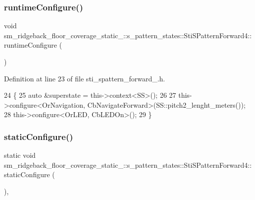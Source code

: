 \subsubsection{\texorpdfstring{runtime\+Configure()}{runtimeConfigure()}}
{\footnotesize\ttfamily void sm\+\_\+ridgeback\+\_\+floor\+\_\+coverage\+\_\+static\+\_\+::s\+\_\+pattern\+\_\+states\+::\+Sti\+S\+Pattern\+Forward4\+::runtime\+Configure (\begin{DoxyParamCaption}{ }\end{DoxyParamCaption})\hspace{0.3cm}{\ttfamily [inline]}}



Definition at line 23 of file sti\+\_\+spattern\+\_\+forward\+\_.\+h.


\begin{DoxyCode}
24   \{
25     \textcolor{keyword}{auto} &superstate = this->context<SS>();
26 
27     this->configure<OrNavigation, CbNavigateForward>(SS::pitch2\_lenght\_meters());
28     this->configure<OrLED, CbLEDOn>();
29   \}
\end{DoxyCode}
\mbox{\label{structsm__ridgeback__floor__coverage__static__1_1_1s__pattern__states_1_1StiSPatternForward4_ad211e38e40c4891bb0899edba2bb5fb8}} 
\subsubsection{\texorpdfstring{static\+Configure()}{staticConfigure()}}
{\footnotesize\ttfamily static void sm\+\_\+ridgeback\+\_\+floor\+\_\+coverage\+\_\+static\+\_\+::s\+\_\+pattern\+\_\+states\+::\+Sti\+S\+Pattern\+Forward4\+::static\+Configure (\begin{DoxyParamCaption}{ }\end{DoxyParamCaption})\hspace{0.3cm}{\ttfamily [inline]}, {\ttfamily [static]}}



